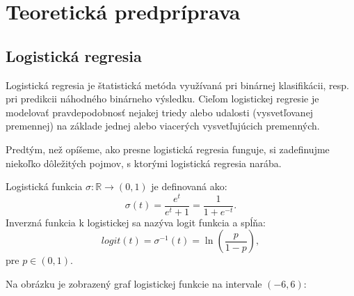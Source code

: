\section{Teoretická predpríprava}
\label{teoreticka predpriprava}

\subsection{Logistická regresia}
 
Logistická regresia je štatistická metóda využívaná pri binárnej klasifikácii, resp. pri predikcii náhodného binárneho výsledku.
Cieľom logistickej regresie je modelovať pravdepodobnosť nejakej triedy alebo udalosti (vysvetľovanej premennej)
na základe jednej alebo viacerých vysvetľujúcich premenných.

Predtým, než opíšeme, ako presne logistická regresia funguje, si zadefinujme niekoľko dôležitých pojmov, s ktorými logistická regresia narába.

\begin{defin}
    Logistická funkcia \( \sigma : \mathbb{R} \rightarrow (0, 1) \) je definovaná ako:
    \[
        \sigma(t) = \frac{e^t}{e^t + 1} = \frac{1}{1 + e^{-t}}.
    \]
    Inverzná funkcia k logistickej sa nazýva logit funkcia a spĺňa:
    \[
        logit(t) = \sigma^{-1}(t) = \ln\left(\frac{p}{1 - p}\right),
    \]
    pre \( p \in (0, 1) \).
\end{defin}

Na obrázku je zobrazený graf logistickej funkcie na intervale \( (-6, 6) \):

    
        


